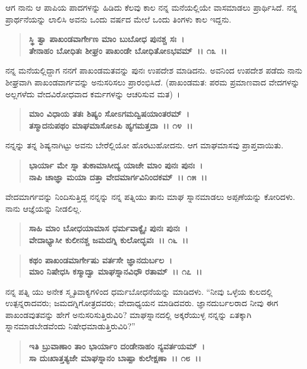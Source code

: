 ಆಗ ನಾನು ಆ ಪಾಪಿಯ ಪಾದಗಳನ್ನು ಹಿಡಿದು ಕೆಲವು ಕಾಲ ನನ್ನ ಮನೆಯಲ್ಲಿಯೇ ವಾಸಮಾಡಲು ಪ್ರಾರ್ಥಿಸಿದೆ. ನನ್ನ ಪ್ರಾರ್ಥನೆಯನ್ನು ಲಾಲಿಸಿ ಅವನು ಒಂದು ವರ್ಷದ ಮೇಲೆ ಒಂದು ತಿಂಗಳು ಕಾಲ ಇದ್ದನು.

\begin{verse}
\textbf{ಸ್ಥಿ ತ್ವಾ ಪಾಖಂಡವಾರ್ಗೇಣ ಮಾಂ ಬುಬೋಧ ಪುನಶ್ಚ ಸಃ~।}\\\textbf{ತೇನಾಹಂ ಬೋಧಿತಃ ಶೀಘ್ರಂ ಪಾಖಂಡೇ ಬೋಧಿತೋಽಭವಮ್~।। ೧೩~।।}
\end{verse}

ನನ್ನ ಮನೆಯಲ್ಲಿದ್ದಾಗ ನನಗೆ ಪಾಖಂಡಮತವನ್ನು ಪುನಃ ಉಪದೇಶ ಮಾಡಿದನು. ಅವನಿಂದ ಉಪದೇಶ ಪಡೆದು ನಾನು ಶೀಘ್ರವಾಗಿ ಪಾಖಂಡವಾರ್ಗವನ್ನು ಅನುಸರಿಸಲು ಪ್ರಾರಂಭಿಸಿದೆ. (ಪಾಖಂಡಮತ: ಪರಮ ಪ್ರಮಾಣವಾದ ವೇದಗಳನ್ನು ಅಲ್ಲಗಳೆದು ವೇದವಿರೋಧವಾದ ಕರ್ಮಗಳನ್ನು ಆಚರಿಸುವ ಮತ)~।

\begin{verse}
\textbf{ಮಾಂ ವಿಧಾಯ ತತಃ ಶಿಷ್ಯಂ ಸೋಽಗಮದ್ವಿಷಯಾಂತರಮ್~।}\\\textbf{ತಸ್ಮಾದನುಪಥಂ ಮಾಘಮಾಸೋಽಪಿ ಹ್ಯಗಮತ್ತದಾ~।। ೧೪~।।}
\end{verse}

ನನ್ನನ್ನು ತನ್ನ ಶಿಷ್ಯನಾಗಿಟ್ಟು ಅವನು ಬೇರೆಲ್ಲಿಯೋ ಹೊರಟುಹೋದನು. ಆಗ ಮಾಘಮಾಸವು ಪ್ರಾಪ್ತವಾಯಿತು.

\begin{verse}
\textbf{ಭಾರ್ಯಾ ಮೇ ಸ್ನಾ ತುಕಾಮಾಸೀದ್ಯ ಯಾಚೇ ಮಾಂ ಪುನಃ ಪುನಃ~।}\\\textbf{ನಾಪಿ ಚಾಜ್ಞಾ ಮಯಾ ದತ್ತಾ ವೇದಮಾರ್ಗವಿನಿಂದಕಮ್~।। ೧೫~।।}
\end{verse}

ವೇದಮಾರ್ಗವನ್ನು ನಿಂದಿಸುತ್ತಿದ್ದ ನನ್ನನ್ನು ನನ್ನ ಪತ್ನಿಯು ತಾನು ಮಾಘ ಸ್ನಾನಮಾಡಲು ಅಪ್ಪಣೆಯನ್ನು ಕೋರಿದಳು. ನಾನು ಆಜ್ಞೆಯನ್ನು ನೀಡಲಿಲ್ಲ.

\begin{verse}
\textbf{ಸಾಹಿ ಮಾಂ ಬೋಧಯಾಮಾಸ ಧರ್ಮವಾಕ್ಯೈಃ ಪುನಃ ಪುನಃ~।}\\\textbf{ವೇದಾಭ್ಯಾಸೀ ಕುಲೀನಶ್ಚ ಜಮದಗ್ನಿ ಕುಲೋದ್ಭವಃ~।। ೧೬~।।} 
\end{verse}

\begin{verse}
\textbf{ಕಥಂ ಪಾಖಂಡಮಾರ್ಗೇಷು ವರ್ತಸೇ ಜ್ಞಾನದುರ್ಬಲ~।}\\\textbf{ಮಾಂ ನಿಷೇಧಸಿ ಕಸ್ಮಾದ್ವಾ ಮಾಘಸ್ನಾನವಿಧೌ ರತಾಮ್~।। ೧೭~।।}
\end{verse}

ನನ್ನ ಪತ್ನಿ ಯು ಅನೇಕ ಸ್ಮೃತಿವಾಕ್ಯಗಳಿಂದ ಧರ್ಮಬೋಧನೆಯನ್ನು ಮಾಡಿದಳು. “ನೀವು ಒಳ್ಳೆಯ ಕುಲದಲ್ಲಿ ಉತ್ಪನ್ನರಾದವರು; ಜಮದಗ್ನಿಗೋತ್ರದವರು; ವೇದಾಧ್ಯಯನ ಮಾಡಿದವರು. ಜ್ಞಾನದುರ್ಬಲರಾದ ನೀವು ಈಗ ಪಾಖಂಡವುತವನ್ನು ಹೇಗೆ ಅನುಸರಿಸುತ್ತಿರುವಿರಿ? ಮಾಘಸ್ನಾನದಲ್ಲಿ ಅಕ್ಕರೆಯುಳ್ಳ ನನ್ನನ್ನು ಏತಕ್ಕಾಗಿ ಸ್ನಾನಮಾಡಬೇಡವೆಂದು ನಿಷೇಧಮಾಡುತ್ತಿರುವಿರಿ?”

\begin{verse}
\textbf{ಇತಿ ಬ್ರುವಾಣಾಂ ತಾಂ ಭಾರ್ಯಾಂ ದಂಡೇನಾಹಂ ನ್ಯವರ್ತಯಮ್~।}\\\textbf{ಸಾ ದುಃಖಾತ್ತತ್ಯಜೇ ಮಾಘಸ್ನಾನಂ ಬಾಷ್ಪಾ ಕುಲೇಕ್ಷಣಾ~।। ೧೮~।।}
\end{verse}

